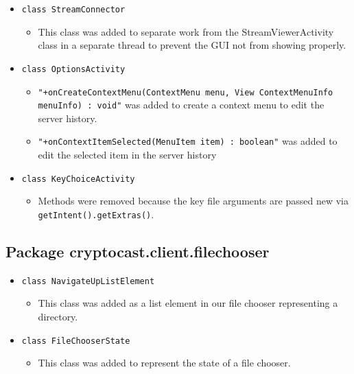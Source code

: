 \documentclass[a4paper,10pt]{scrartcl}
\begin{document}
\begin{itemize}
  \item \lstinline|class StreamConnector|
  \begin{itemize}
  \item This class was added to separate work from the StreamViewerActivity class
  in a separate thread to prevent the GUI not from showing properly.
  \end{itemize}

  \item \lstinline|class OptionsActivity|
  \begin{itemize}
  \item \lstinline|"+onCreateContextMenu(ContextMenu menu, View ContextMenuInfo menuInfo) : void"| was added to 
  create a context menu to edit the server history.
  \item \lstinline|"+onContextItemSelected(MenuItem item) : boolean"| was added to edit the selected item in the server history
    \end{itemize}

  
  \item \lstinline|class KeyChoiceActivity|
  \begin{itemize}
  \item Methods were removed because the key file arguments are passed new via \lstinline|getIntent().getExtras()|. 
  \end{itemize}



\end{itemize}


\subsection{Package cryptocast.client.filechooser}

\begin{itemize}

 \item \lstinline|class NavigateUpListElement|
  \begin{itemize}
   \item This class was added as a list element in our file chooser representing a directory.
  \end{itemize}

    \item \lstinline|class FileChooserState|
  \begin{itemize}
   \item This class was added to represent the state of a file chooser.
  \end{itemize}

\end{itemize}
\end{document}
